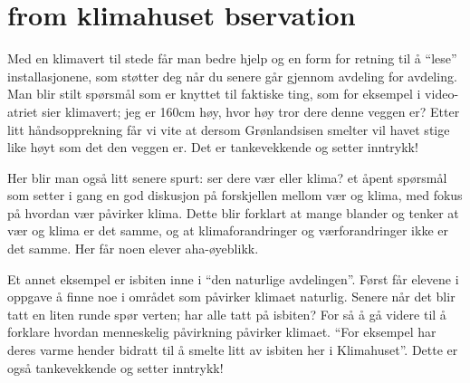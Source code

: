 \section{from klimahuset bservation}
Med en klimavert til stede får man bedre hjelp og en form for retning til å “lese” installasjonene, som støtter deg når du senere går gjennom avdeling for avdeling. 
Man blir stilt spørsmål som er knyttet til faktiske ting, som for eksempel i video-atriet sier klimavert; jeg er 160cm høy, hvor høy tror dere denne veggen er?
Etter litt håndsopprekning får vi vite at dersom Grønlandsisen smelter vil havet stige like høyt som det den veggen er. Det er tankevekkende og setter inntrykk!

Her blir man også litt senere spurt: ser dere vær eller klima? et åpent spørsmål som setter i gang en god diskusjon på forskjellen mellom vær og klima, med fokus på hvordan vær påvirker klima. Dette blir forklart at mange blander og tenker at vær og klima er det samme, og at klimaforandringer og værforandringer ikke er det samme. Her får noen elever aha-øyeblikk.


Et annet eksempel er isbiten inne i “den naturlige avdelingen”.  Først får elevene i oppgave å finne noe i området som påvirker klimaet naturlig. Senere når det blir tatt en liten runde spør verten; har alle tatt på isbiten? For så å gå videre til å forklare hvordan menneskelig påvirkning påvirker klimaet. “For eksempel har deres varme hender bidratt til å smelte litt av isbiten her i Klimahuset”. Dette er også tankevekkende og setter inntrykk!